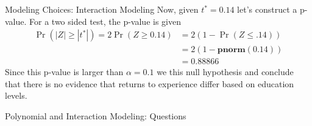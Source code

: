 \documentclass[notheorems,9pt]{beamer}
\begin{document}
\begin{frame}{Modeling Choices: Interaction Modeling} 
	\label{frame:interaction3}
	Now, given \(t^* = 0.14\) let's construct a p-value. For a two sided test, the p-value is given 
	\begin{align*}
		\Pr(|Z| \geq |t^*|) = 2\Pr(Z \geq 0.14) &= 2\left(1 - \Pr(Z\leq .14)\right) \\
											   &= 2\left(1 - \textbf{pnorm}(0.14)\right) \\
											   &= 0.88866
	\end{align*} 
	\onslide<2->
	Since this p-value is larger than \(\alpha = 0.1\) we  this null hypothesis and conclude that there is no evidence that returns to experience differ based on education levels.
\end{frame}
\begin{frame}{Polynomial and Interaction Modeling: Questions}
	\centering
\end{frame} 
\end{document}

